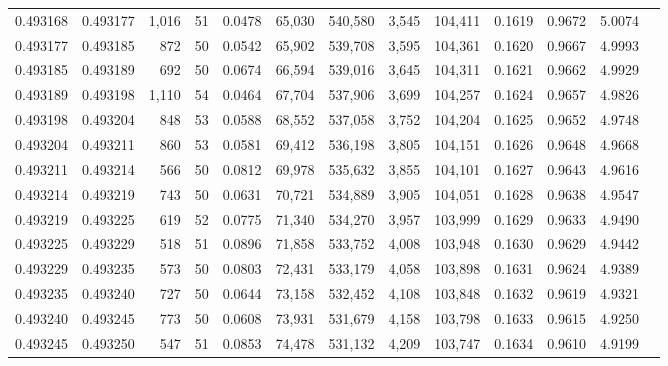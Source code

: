 \begin{tabular}{rrrrrrrrrrrrr}
0.493168 & 0.493177 & 1,016 &  51 &                                     0.0478 &  65,030 & 540,580 &   3,545 & 104,411 & 0.1619 & 0.9672 & 5.0074 \\
0.493177 & 0.493185 &   872 &  50 &                                     0.0542 &  65,902 & 539,708 &   3,595 & 104,361 & 0.1620 & 0.9667 & 4.9993 \\
0.493185 & 0.493189 &   692 &  50 &                                     0.0674 &  66,594 & 539,016 &   3,645 & 104,311 & 0.1621 & 0.9662 & 4.9929 \\
0.493189 & 0.493198 & 1,110 &  54 &                                     0.0464 &  67,704 & 537,906 &   3,699 & 104,257 & 0.1624 & 0.9657 & 4.9826 \\
0.493198 & 0.493204 &   848 &  53 &                                     0.0588 &  68,552 & 537,058 &   3,752 & 104,204 & 0.1625 & 0.9652 & 4.9748 \\
0.493204 & 0.493211 &   860 &  53 &                                     0.0581 &  69,412 & 536,198 &   3,805 & 104,151 & 0.1626 & 0.9648 & 4.9668 \\
0.493211 & 0.493214 &   566 &  50 &                                     0.0812 &  69,978 & 535,632 &   3,855 & 104,101 & 0.1627 & 0.9643 & 4.9616 \\
0.493214 & 0.493219 &   743 &  50 &                                     0.0631 &  70,721 & 534,889 &   3,905 & 104,051 & 0.1628 & 0.9638 & 4.9547 \\
0.493219 & 0.493225 &   619 &  52 &                                     0.0775 &  71,340 & 534,270 &   3,957 & 103,999 & 0.1629 & 0.9633 & 4.9490 \\
0.493225 & 0.493229 &   518 &  51 &                                     0.0896 &  71,858 & 533,752 &   4,008 & 103,948 & 0.1630 & 0.9629 & 4.9442 \\
0.493229 & 0.493235 &   573 &  50 &                                     0.0803 &  72,431 & 533,179 &   4,058 & 103,898 & 0.1631 & 0.9624 & 4.9389 \\
0.493235 & 0.493240 &   727 &  50 &                                     0.0644 &  73,158 & 532,452 &   4,108 & 103,848 & 0.1632 & 0.9619 & 4.9321 \\
0.493240 & 0.493245 &   773 &  50 &                                     0.0608 &  73,931 & 531,679 &   4,158 & 103,798 & 0.1633 & 0.9615 & 4.9250 \\
0.493245 & 0.493250 &   547 &  51 &                                     0.0853 &  74,478 & 531,132 &   4,209 & 103,747 & 0.1634 & 0.9610 & 4.9199 \\

\end{tabular}
